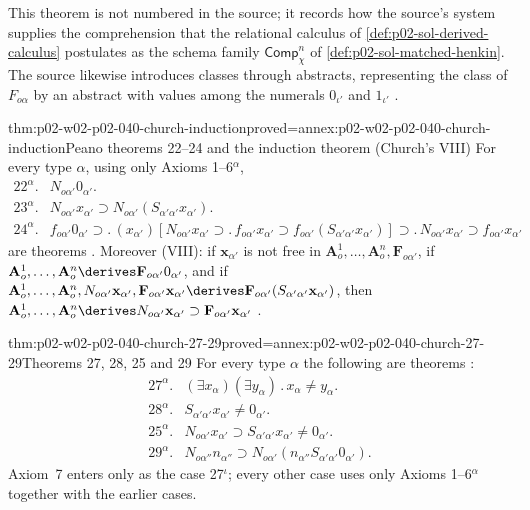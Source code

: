 This theorem is not numbered in the source; it records how the source's
system supplies the comprehension that the relational calculus of
\cref{def:p02-sol-derived-calculus} postulates as the schema family \(\mathsf{Comp}^n_\chi\) of \cref{def:p02-sol-matched-henkin}.  The source likewise introduces
classes through abstracts, representing the class of \(F_{o\alpha}\) by an
abstract with values among the numerals \(0_{\iota'}\) and \(1_{\iota'}\)
\cite[\S4, p.~61]{Church1940}.

\begin{hbtheorem}{thm:p02-w02-p02-040-church-induction}{proved=annex:p02-w02-p02-040-church-induction}{Peano theorems 22--24 and the induction theorem (Church's VIII)}
For every type \(\alpha\), using only Axioms 1--6\(^\alpha\),
\[
\begin{array}{rl}
 22^\alpha. & N_{o\alpha'}0_{\alpha'}.\\
 23^\alpha. & N_{o\alpha'}x_{\alpha'}\supset N_{o\alpha'}(S_{\alpha'\alpha'}x_{\alpha'}).\\
 24^\alpha. & f_{o\alpha'}0_{\alpha'}\supset.\,(x_{\alpha'})[N_{o\alpha'}x_{\alpha'}\supset.\,f_{o\alpha'}x_{\alpha'}\supset f_{o\alpha'}(S_{\alpha'\alpha'}x_{\alpha'})]\supset.\,N_{o\alpha'}x_{\alpha'}\supset f_{o\alpha'}x_{\alpha'}
\end{array}
\]
are theorems \cite[\S6, p.~64]{Church1940}.  Moreover (VIII): if
\(\mathbf x_{\alpha'}\) is not free in
\(\mathbf A^1_o,\ldots,\mathbf A^n_o,\mathbf F_{o\alpha'}\), if
\(\mathbf A^1_o,\ldots,\mathbf A^n_o\derives\mathbf F_{o\alpha'}0_{\alpha'}\), and if
\(\mathbf A^1_o,\ldots,\mathbf A^n_o,N_{o\alpha'}\mathbf x_{\alpha'},
\mathbf F_{o\alpha'}\mathbf x_{\alpha'}\derives
\mathbf F_{o\alpha'}(S_{\alpha'\alpha'}\mathbf x_{\alpha'})\), then
\(\mathbf A^1_o,\ldots,\mathbf A^n_o\derives
N_{o\alpha'}\mathbf x_{\alpha'}\supset\mathbf F_{o\alpha'}\mathbf x_{\alpha'}\)
\cite[\S6, p.~64]{Church1940}.
\end{hbtheorem}

\begin{hbtheorem}{thm:p02-w02-p02-040-church-27-29}{proved=annex:p02-w02-p02-040-church-27-29}{Theorems 27, 28, 25 and 29}
For every type \(\alpha\) the following are theorems
\cite[\S6, pp.~64--65]{Church1940}:
\[
\begin{array}{rl}
 27^\alpha. & (\exists x_\alpha)(\exists y_\alpha)\,.\,x_\alpha\neq y_\alpha.\\
 28^\alpha. & S_{\alpha'\alpha'}x_{\alpha'}\neq0_{\alpha'}.\\
 25^\alpha. & N_{o\alpha'}x_{\alpha'}\supset S_{\alpha'\alpha'}x_{\alpha'}\neq0_{\alpha'}.\\
 29^\alpha. & N_{o\alpha''}n_{\alpha''}\supset N_{o\alpha'}(n_{\alpha''}S_{\alpha'\alpha'}0_{\alpha'}).
\end{array}
\]
Axiom~7 enters only as the case 27\(^\iota\); every other case uses only
Axioms 1--6\(^\alpha\) together with the earlier cases.
\end{hbtheorem}


